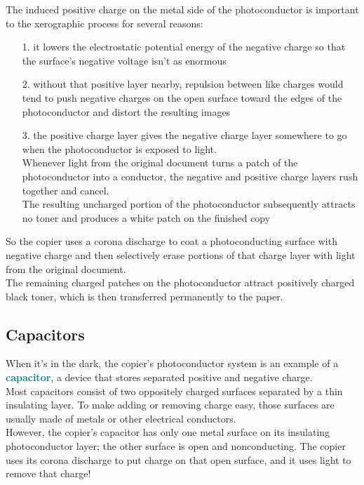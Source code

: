 \documentclass[12pt]{article}
\theoremstyle{definition}
\newcommand{\defnterm}[1]{\textbf{\textcolor{teal}{#1}}\index{#1}}
\begin{document}
The induced positive charge on the metal side of the photoconductor is important to the xerographic process for several reasons:
\begin{enumerate}
  \item[1.] it lowers the electrostatic potential energy of the negative charge so that the surface's negative voltage isn't as enormous
  \item[2.] without that positive layer nearby, repulsion between like charges would tend to push negative charges on the open surface toward the edges of the photoconductor and distort the resulting images
  \item[3.] the positive charge layer gives the negative charge layer somewhere to go when the photoconductor is exposed to light. \\
  Whenever light from the original document turns a patch of the photoconductor into a conductor, the negative and positive charge layers rush together and cancel. \\
  The resulting uncharged portion of the photoconductor subsequently attracts no toner and produces a white patch on the finished copy
\end{enumerate}

So the copier uses a corona discharge to coat a photoconducting surface with negative charge and then selectively erase portions of that charge layer with light from the original document. \\
The remaining charged patches on the photoconductor attract positively charged black toner, which is then transferred permanently to the paper.

\subsection{Capacitors}
When it's in the dark, the copier's photoconductor system is an example of a \defnterm{capacitor}, a device that stores separated positive and negative charge. \\
Most capacitors consist of two oppositely charged surfaces separated by a thin insulating layer.
To make adding or removing charge easy, those surfaces are usually made of metals or other electrical conductors. \\
However, the copier's capacitor has only one metal surface on its insulating photoconductor layer;
the other surface is open and nonconducting.
The copier uses its corona discharge to put charge on that open surface, and it uses light to remove that charge! \\
\end{document}
